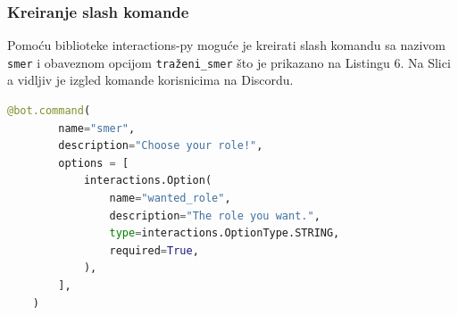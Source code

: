 \documentclass[a4paper,11pt]{article}
\begin{document}
\subsubsection{Kreiranje slash komande}
Pomoću biblioteke interactions-py moguće je kreirati slash komandu sa nazivom \texttt{smer} i obaveznom opcijom \texttt{traženi\_smer} što je prikazano na Listingu 6. Na Slici a vidljiv je izgled komande korisnicima na Discordu.
\begin{lstlisting}[language=Python, caption=Kreiranje slash komande]
    @bot.command(
        name="smer",
        description="Choose your role!",
        options = [
            interactions.Option(
                name="wanted_role",
                description="The role you want.",
                type=interactions.OptionType.STRING,
                required=True,
            ),
        ],
    )
\end{lstlisting}
\begin{figure}[h]
    \centering
\end{figure}
\newpage
\end{document}
